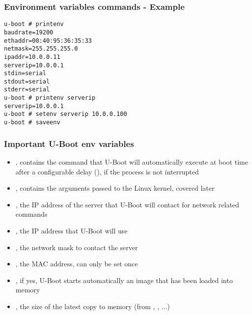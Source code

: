 \begin{frame}[fragile]
\frametitle{Environment variables commands - Example}
\begin{verbatim}
u-boot # printenv
baudrate=19200
ethaddr=00:40:95:36:35:33
netmask=255.255.255.0
ipaddr=10.0.0.11
serverip=10.0.0.1
stdin=serial
stdout=serial
stderr=serial
u-boot # printenv serverip
serverip=10.0.0.1
u-boot # setenv serverip 10.0.0.100
u-boot # saveenv
\end{verbatim}
\end{frame}

\begin{frame}
  \frametitle{Important U-Boot env variables}
  \begin{itemize}
  \item {}, contains the command that U-Boot will
    automatically execute at boot time after a configurable delay
    (), if the process is not interrupted
  \item {}, contains the arguments passed to the Linux
    kernel, covered later
  \item {}, the IP address of the server that U-Boot will
    contact for network related commands
  \item {}, the IP address that U-Boot will use
  \item {}, the network mask to contact the server
  \item {}, the MAC address, can only be set once
  \item {}, if yes, U-Boot starts automatically an image
    that has been loaded into memory
  \item {}, the size of the latest copy to memory
    (from , , ...)
  \end{itemize}
\end{frame}

